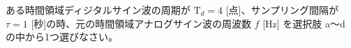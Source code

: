 ある時間領域ディジタルサイン波の周期が $\textrm{T}_d = 4$ [点]、サンプリング間隔が $\tau = 1$ [秒]の時、元の時間領域アナログサイン波の周波数 $f$ [Hz] を選択肢 a〜d の中から1つ選びなさい。
